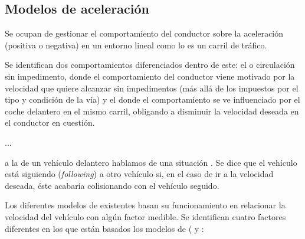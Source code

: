 \subsection{Modelos de aceleración}

Se ocupan de gestionar el comportamiento del conductor sobre la aceleración (positiva o negativa) en un entorno lineal como lo es un carril de tráfico.

Se identifican dos comportamientos diferenciados dentro de este: el \textbf{} o circulación sin impedimento, donde el comportamiento del conductor viene motivado por la velocidad que quiere alcanzar sin impedimentos (más allá de los impuestos por el tipo y condición de la vía) y el \textbf{} donde el comportamiento se ve influenciado por el coche delantero en el mismo carril, obligando a disminuir la velocidad deseada en el conductor en cuestión.

 ...

 a la de un vehículo delantero hablamos de una situación \textbf{}. Se dice que el vehículo está siguiendo (\textit{following}) a otro vehículo si, en el caso de ir a la velocidad deseada, éste acabaría colisionando con el vehículo seguido.

Los diferentes modelos de  existentes basan su funcionamiento en relacionar la velocidad del vehículo con algún factor medible. Se identifican cuatro factores diferentes en los que están basados los modelos de  (\cite{Aghabayk2015} y \cite{Toledo2007-3}:

